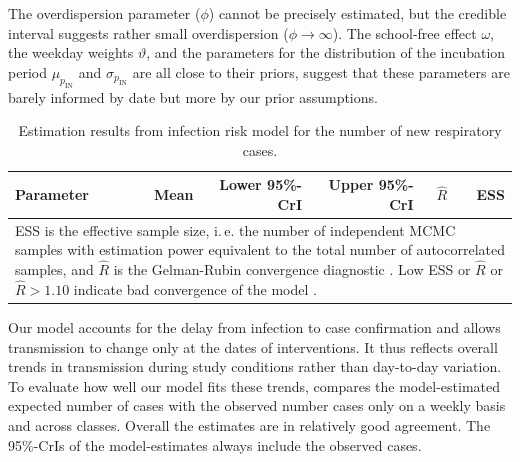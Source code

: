 \documentclass[fleqn,11pt]{wlscirep_supp}
\newcommand\ie{i.\,e.\xspace}
\begin{document}
The overdispersion parameter ($\phi$) cannot be precisely estimated, but the credible interval suggests rather small overdispersion ($\phi \rightarrow \infty$). The school-free effect $\omega$, the weekday weights $\vartheta$, and the parameters for the distribution of the incubation period $\mu_{p_{\text{IN}}}$ and $\sigma_{p_{\text{IN}}}$ are all close to their priors, suggest that these parameters are barely informed by date but more by our prior assumptions.

\begin{table}[!htpb]
    \caption[Estimation results from infection risk model]{Estimation results from infection risk model for the number of new respiratory cases.}
    \label{tab:estimation-results}
    \footnotesize
    \centering
    \begin{tabular}{lrrrrr}
    \toprule
    Parameter & Mean & Lower 95\%-CrI & Upper 95\%-CrI & $\hat{R}$ & ESS \\
    \midrule
    
    \bottomrule
    \multicolumn{6}{p{13cm}}{\scriptsize
        ESS is the effective sample size, \ie the number of independent MCMC samples with estimation power equivalent to the total number of autocorrelated samples\cite{Stan2022}, and $\hat{R}$ is the Gelman-Rubin convergence diagnostic \cite{Gelman1992}. Low ESS or $\hat{R}$ or $\hat{R}>1.10$ indicate bad convergence of the model \cite{Gelman2013}.}
    \end{tabular}
\end{table}

Our model accounts for the delay from infection to case confirmation and allows transmission to change only at the dates of interventions. It thus reflects overall trends in transmission during study conditions rather than day-to-day variation. To evaluate how well our model fits these trends,  compares the model-estimated expected number of cases  with the observed number cases only on a weekly basis and across classes. Overall the estimates are in relatively good agreement. The 95\%-CrIs of the model-estimates always include the observed cases. 
\end{document}
